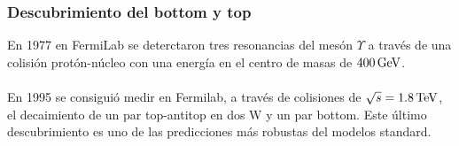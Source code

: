\subsubsection{Descubrimiento del bottom y top}
En 1977 en FermiLab se deterctaron tres resonancias del mesón $\Upsilon$ a través de una colisión protón-núcleo con una energía en el centro de masas de $\unit[400]{GeV}$.\\\\
En 1995 se consiguió medir en Fermilab, a través de colisiones de $\sqrt{s}=\unit[1.8]{TeV}$, el decaimiento de un par top-antitop en dos W y un par bottom. Este último descubrimiento es uno de las predicciones más robustas del modelos standard.